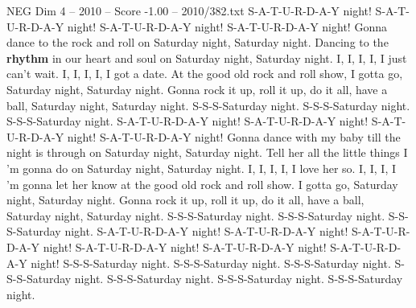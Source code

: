 \begin{textsample}{NEG Dim 4 – 2010 – Score -1.00 – 2010/382.txt}  \label{ex:f4_neg_018}
S-A-T-U-R-D-A-Y night!
S-A-T-U-R-D-A-Y night!
S-A-T-U-R-D-A-Y night!
S-A-T-U-R-D-A-Y night!
Gonna dance to the rock and roll on Saturday night, Saturday night.
Dancing to the \textbf{rhythm} in our heart and soul on Saturday night, Saturday night.
I, I, I, I, I just can't wait.
I, I, I, I, I got a date.
At the good old rock and roll show, I gotta go, Saturday night, Saturday night.
Gonna rock it up, roll it up, do it all, have a ball, Saturday night, Saturday night.
S-S-S-Saturday night.
S-S-S-Saturday night.
S-S-S-Saturday night.
S-A-T-U-R-D-A-Y night!
S-A-T-U-R-D-A-Y night!
S-A-T-U-R-D-A-Y night!
S-A-T-U-R-D-A-Y night!
Gonna dance with my baby till the night is through on Saturday night, Saturday night.
Tell her all the little things I 'm gonna do on Saturday night, Saturday night.
I, I, I, I, I love her so.
I, I, I, I 'm gonna let her know at the good old rock and roll show.
I gotta go, Saturday night, Saturday night.
Gonna rock it up, roll it up, do it all, have a ball, Saturday night, Saturday night.
S-S-S-Saturday night.
S-S-S-Saturday night.
S-S-S-Saturday night.
S-A-T-U-R-D-A-Y night!
S-A-T-U-R-D-A-Y night!
S-A-T-U-R-D-A-Y night!
S-A-T-U-R-D-A-Y night!
S-A-T-U-R-D-A-Y night!
S-A-T-U-R-D-A-Y night!
S-S-S-Saturday night.
S-S-S-Saturday night.
S-S-S-Saturday night.
S-S-S-Saturday night.
S-S-S-Saturday night.
S-S-S-Saturday night.
S-S-S-Saturday night.

\end{textsample}
